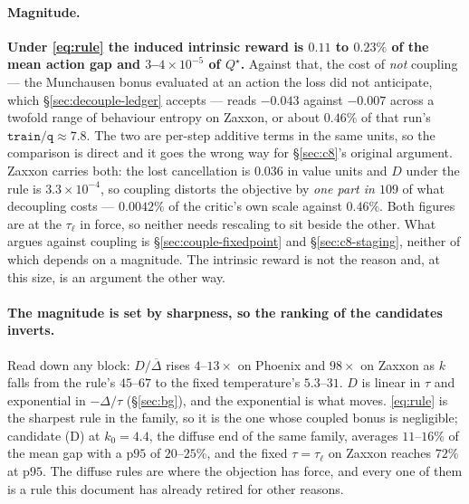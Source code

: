 \documentclass{article}
\newcommand{\gap}{\Delta}
\newcommand{\gapbar}{\overline{\Delta}}
\begin{document}
\paragraph{Magnitude.} \textbf{Under \eqref{eq:rule} the induced intrinsic reward is $0.11$ to
$0.23\%$ of the mean action gap and $3$--$4\times10^{-5}$ of $Q^\star$.} Against that,
the cost of \emph{not} coupling --- the Munchausen bonus evaluated at an action the loss did not
anticipate, which \S\ref{sec:decouple-ledger} accepts --- reads $-0.043$ against $-0.007$ across a
twofold range of behaviour entropy on Zaxxon, or about $0.46\%$ of that run's
$\texttt{train/q} \approx 7.8$. The two are per-step additive terms in the same units, so the
comparison is direct and it goes the wrong way for \S\ref{sec:c8}'s original argument. Zaxxon
carries both: the lost cancellation is $0.036$ in value units and $D$ under the rule is
$3.3\times10^{-4}$, so coupling distorts the objective by \emph{one part in $109$} of what
decoupling costs --- $0.0042\%$ of the critic's own scale against $0.46\%$. Both figures are at
the $\tau_\ell$ in force, so neither needs rescaling to sit beside the other. What argues against coupling is
\S\ref{sec:couple-fixedpoint} and \S\ref{sec:c8-staging}, neither of which depends on a
magnitude. The intrinsic reward is not the reason and, at this size, is an argument the other
way.

\paragraph{The magnitude is set by sharpness, so the ranking of the candidates inverts.} Read
down any block: $D/\gapbar$ rises $4$--$13\times$ on Phoenix and $98\times$ on Zaxxon as $k$
falls from the rule's $45$--$67$ to the fixed temperature's $5.3$--$31$. $D$ is linear in $\tau$
and exponential in $-\gap/\tau$ (\S\ref{sec:bg}), and the exponential is what moves.
\eqref{eq:rule} is the sharpest rule in the family, so it is the one whose coupled bonus is
negligible; candidate (D) at $k_0 = 4.4$, the diffuse end of the same family, averages
$11$--$16\%$ of the mean gap with a $\text{p}95$ of $20$--$25\%$, and the fixed $\tau = \tau_\ell$
on Zaxxon reaches $72\%$ at $\text{p}95$. The diffuse rules are where the objection has force, and
every one of them is a rule this document has already retired for other reasons.
\end{document}

